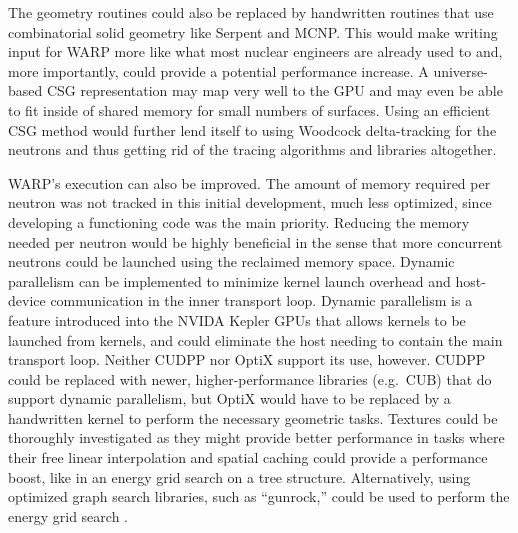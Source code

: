 \documentclass[preprint,12pt]{elsarticle}
\begin{document}

The geometry routines could also be replaced by handwritten routines that use combinatorial solid geometry like Serpent and MCNP.  This would make writing input for WARP more like what most nuclear engineers are already used to and, more importantly, could provide a potential performance increase.  A universe-based CSG representation may map very well to the GPU and may even be able to fit inside of shared memory for small numbers of surfaces.  Using an efficient CSG method would further lend itself to using Woodcock delta-tracking for the neutrons and thus getting rid of the tracing algorithms and libraries altogether.   

WARP's execution can also be improved.  The amount of memory required per neutron was not tracked in this initial development, much less optimized, since developing a functioning code was the main priority.  Reducing the memory needed per neutron would be highly beneficial in the sense that more concurrent neutrons could be launched using the reclaimed memory space.  Dynamic parallelism can be implemented to minimize kernel launch overhead and host-device communication in the inner transport loop.  Dynamic parallelism is a feature introduced into the NVIDA Kepler GPUs that allows kernels to be launched from kernels, and could eliminate the host needing to contain the main transport loop.  Neither CUDPP nor OptiX support its use, however.  CUDPP could be replaced with newer, higher-performance libraries (e.g.\ CUB) that do support dynamic parallelism, but OptiX would have to be replaced by a handwritten kernel to perform the necessary geometric tasks.  Textures could be thoroughly investigated as they might provide better performance in tasks where their free linear interpolation and spatial caching could provide a performance boost, like in an energy grid search on a tree structure.   Alternatively, using optimized graph search libraries, such as ``gunrock,'' could be used to perform the energy grid search \cite{gunrock}.

\end{document}

